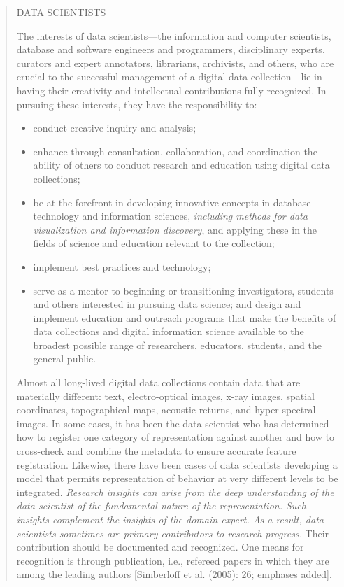 \documentclass[
  letterpaper,
]{report}
\begin{document}
\begin{quote}
DATA SCIENTISTS

The interests of data scientists---the information and computer
scientists, database and software engineers and programmers,
disciplinary experts, curators and expert annotators, librarians,
archivists, and others, who are crucial to the successful management of
a digital data collection---lie in having their creativity and
intellectual contributions fully recognized. In pursuing these
interests, they have the responsibility to:

\begin{itemize}
\item
  conduct creative inquiry and analysis;
\item
  enhance through consultation, collaboration, and coordination the
  ability of others to conduct research and education using digital data
  collections;
\item
  be at the forefront in developing innovative concepts in database
  technology and information sciences, \emph{including methods for data
  visualization and information discovery}, and applying these in the
  fields of science and education relevant to the collection;
\item
  implement best practices and technology;
\item
  serve as a mentor to beginning or transitioning investigators,
  students and others interested in pursuing data science; and design
  and implement education and outreach programs that make the benefits
  of data collections and digital information science available to the
  broadest possible range of researchers, educators, students, and the
  general public.
\end{itemize}

Almost all long-lived digital data collections contain data that are
materially different: text, electro-optical images, x-ray images,
spatial coordinates, topographical maps, acoustic returns, and
hyper-spectral images. In some cases, it has been the data scientist who
has determined how to register one category of representation against
another and how to cross-check and combine the metadata to ensure
accurate feature registration. Likewise, there have been cases of data
scientists developing a model that permits representation of behavior at
very different levels to be integrated. \emph{Research insights can
arise from the deep understanding of the data scientist of the
fundamental nature of the representation. Such insights complement the
insights of the domain expert. As a result, data scientists sometimes
are primary contributors to research progress.} Their contribution
should be documented and recognized. One means for recognition is
through publication, i.e., refereed papers in which they are among the
leading authors {[}Simberloff et al. (2005): 26; emphases added{]}.
\end{quote}
\end{document}
